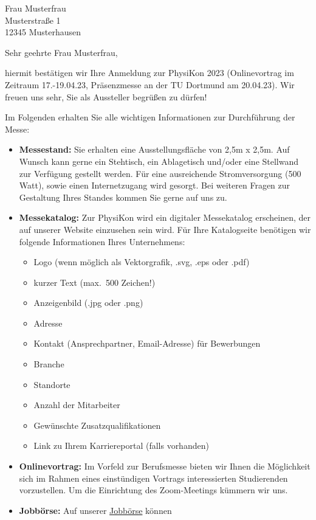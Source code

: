 \documentclass[
  pepbrief,
  fontsize=12pt,
  paper=a4,
  DIV=14,
  parskip=half,
  backaddress=false,
]{scrlttr2}
\author{Netter PhysiKon Helfer}
\begin{document}
\begin{letter}{%
  Frau Musterfrau \\
  Musterstraße 1 \\
  12345 Musterhausen
}
\opening{Sehr geehrte Frau Musterfrau,}
hiermit bestätigen wir Ihre Anmeldung zur PhysiKon 2023 (Onlinevortrag im Zeitraum 17.-19.04.23, 
Präsenzmesse an der TU Dortmund am 20.04.23). 
Wir freuen uns sehr, Sie als Aussteller begrüßen zu dürfen!

Im Folgenden erhalten Sie alle wichtigen Informationen zur Durchführung der Messe:

\begin{itemize}
  \item \textbf{Messestand:} Sie erhalten eine Ausstellungsfläche von 2,5m x 2,5m.
    Auf Wunsch kann gerne ein Stehtisch, ein Ablagetisch und/oder eine Stellwand 
    zur Verfügung gestellt werden.
    Für eine ausreichende Stromversorgung (500 Watt), sowie einen Internetzugang wird gesorgt.
    Bei weiteren Fragen zur Gestaltung Ihres Standes kommen Sie gerne auf uns zu.
    \item \textbf{Messekatalog:} Zur PhysiKon wird ein digitaler Messekatalog erscheinen, der auf unserer Website 
    einzusehen sein wird.
    Für Ihre Katalogseite benötigen wir folgende Informationen Ihres Unternehmens:
    \begin{itemize}
      \item Logo (wenn möglich als Vektorgrafik, .svg, .eps oder .pdf)
      \item kurzer Text (max.\ 500 Zeichen!)
      \item Anzeigenbild (.jpg oder .png)
      \item Adresse
      \item Kontakt (Ansprechpartner, Email-Adresse) für Bewerbungen
      \item Branche
      \item Standorte
      \item Anzahl der Mitarbeiter
      \item Gewünschte Zusatzqualifikationen
      \item Link zu Ihrem Karriereportal (falls vorhanden)
    \end{itemize}
    \item \textbf{Onlinevortrag:} Im Vorfeld zur Berufsmesse bieten wir Ihnen die Möglichkeit sich im Rahmen eines einstündigen Vortrags interessierten
    Studierenden vorzustellen. Um die Einrichtung des Zoom-Meetings kümmern wir uns. 
    \item \textbf{Jobbörse:} Auf unserer \href{https://pep-dortmund.org/jobboerse/}{Jobbörse} können 

\end{itemize}
\end{letter}
\end{document}

